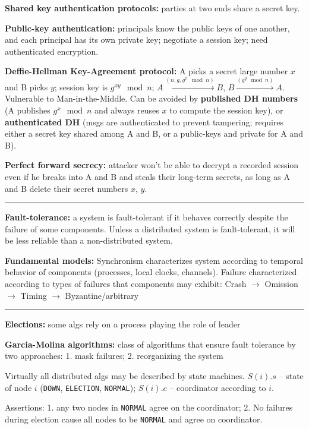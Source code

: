 \documentclass{form}
\begin{document}
\begin{multicols*}{2}
\textbf{Shared key authentication protocols:} parties at two ends share a secret key.

\textbf{Public-key authentication:} principals know the public keys of one another, and each principal has its own private key; negotiate a session key; need authenticated encryption.

\textbf{Deffie-Hellman Key-Agreement protocol:} A picks a secret large number $x$ and B picks $y$; session key is $g^{xy} \mod n$; $A \xrightarrow{(n, g, g^x \mod n)} B$, $B \xrightarrow{(g^y \mod n)} A$. Vulnerable to Man-in-the-Middle. Can be avoided by \textbf{published DH numbers} (A publishes $g^x \mod n$ and always reuses $x$ to compute the session key), or \textbf{authenticated DH} (msgs are authenticated to prevent tampering; requires either a secret key shared among A and B, or a public-keys and private for A and B).

\textbf{Perfect forward secrecy:} attacker won't be able to decrypt a recorded session even if he breaks into A and B and steals their long-term secrets, as long as A and B delete their secret numbers $x$, $y$.

\vspace{-1em}\rule{\linewidth}{0.4pt}

\textbf{Fault-tolerance:} a system is fault-tolerant if it behaves correctly despite the failure of some components. Unless a distributed system is fault-tolerant, it will be less reliable than a non-distributed system.

\textbf{Fundamental models:} Synchronism characterizes system according to temporal behavior of components (processes, local clocks, channels). Failure characterized according to types of failures that components may exhibit: Crash $\rightarrow$ Omission $\rightarrow$ Timing $\rightarrow$ Byzantine/arbitrary

\vspace{-1em}\rule{\linewidth}{0.4pt}

\textbf{Elections:} some algs rely on a process playing the role of leader

\textbf{Garcia-Molina algorithms:} class of algorithms that ensure fault tolerance by two approaches: 1. mask failures; 2. reorganizing the system

Virtually all distributed algs may be described by state machines. $S(i).s$ -- state of node $i$ (\texttt{DOWN}, \texttt{ELECTION}, \texttt{NORMAL}); $S(i).c$ -- coordinator according to $i$.

Assertions: 1. any two nodes in \texttt{NORMAL} agree on the coordinator; 2. No failures during election cause all nodes to be \texttt{NORMAL} and agree on coordinator.


\end{multicols*}
\end{document}
